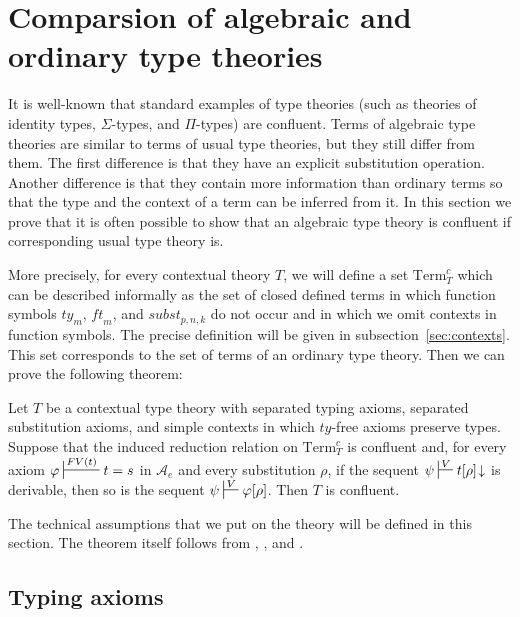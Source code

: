 \documentclass[reqno]{amsart}
\theoremstyle{definition}
\theoremstyle{remark}
\newcommand{\Term}{\mathrm{Term}}
\newcommand{\subst}{\mathit{subst}}
\newcommand{\ft}{\mathit{ft}}
\newcommand{\ty}{\mathit{ty}}
\numberwithin{figure}{section}
\begin{document}
\section{Comparsion of algebraic and ordinary type theories}

It is well-known that standard examples of type theories (such as theories of identity types, $\Sigma$-types, and $\Pi$-types) are confluent.
Terms of algebraic type theories are similar to terms of usual type theories, but they still differ from them.
The first difference is that they have an explicit substitution operation.
Another difference is that they contain more information than ordinary terms so that the type and the context of a term can be inferred from it.
In this section we prove that it is often possible to show that an algebraic type theory is confluent if corresponding usual type theory is.

More precisely, for every contextual theory $T$, we will define a set $\Term_T^c$ which can be described informally as the set of closed defined terms
in which function symbols $\ty_m$, $\ft_m$, and $\subst_{p,n,k}$ do not occur and in which we omit contexts in function symbols.
The precise definition will be given in subsection~\ref{sec:contexts}.
This set corresponds to the set of terms of an ordinary type theory.
Then we can prove the following theorem:

\begin{thm}
Let $T$ be a contextual type theory with separated typing axioms, separated substitution axioms, and simple contexts in which $\ty$-free axioms preserve types.
Suppose that the induced reduction relation on $\Term_T^c$ is confluent and, for every axiom $\varphi \sststile{}{FV(t)} t = s$ in $\mathcal{A}_e$ and every substitution $\rho$,
if the sequent $\psi \sststile{}{V} t[\rho]\!\downarrow$ is derivable, then so is the sequent $\psi \sststile{}{V} \varphi[\rho]$.
Then $T$ is confluent.
\end{thm}

The technical assumptions that we put on the theory will be defined in this section.
The theorem itself follows from , , and .

\subsection{Typing axioms}
\end{document}
